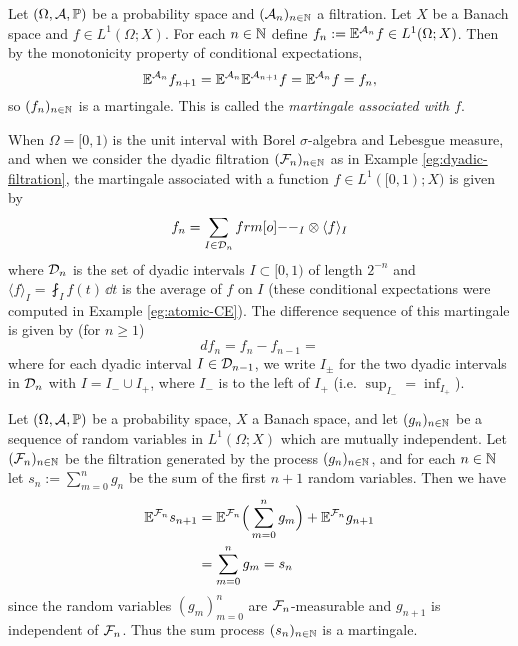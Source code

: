 \begin{example}
  Let $(\Omega, \mathcal{A}, \mathbb{P})$ be a probability space and $(\mathcal{A}_n)_{n \in \mathbb{N}}$ a filtration.
  Let $X$ be a Banach space and $f \in L^1(\Omega;X)$.
  For each $n \in \mathbb{N}$ define $f_n := \mathbb{E}^{\mathcal{A}_n}f \in L^1(\Omega;X)$.
  Then by the monotonicity property of conditional expectations,
  \begin{equation*}
    \mathbb{E}^{\mathcal{A}_n} f_{n+1} = \mathbb{E}^{\mathcal{A}_n} \mathbb{E}^{\mathcal{A}_{n+1}} f = \mathbb{E}^{\mathcal{A}_n} f = f_n,
  \end{equation*}
  so $(f_n)_{n \in \mathbb{N}}$ is a martingale.
  This is called the \emph{martingale associated with $f$}.

  When $\Omega = [0,1)$ is the unit interval with Borel $\sigma$-algebra and Lebesgue measure, and when we consider the dyadic filtration $(\mathcal{F}_n)_{n \in \mathbb{N}}$ as in Example \ref{eg:dyadic-filtration}, the martingale associated with a function $f \in L^1([0,1);X)$ is given by
  \begin{equation*}
    f_n = \sum_{I \in \mc{D}_n} \1_I \otimes \langle f \rangle_I
  \end{equation*}
  where $\mathcal{D}_n$ is the set of dyadic intervals $I \subset [0,1)$ of length $2^{-n}$ and $\langle f \rangle_I = \fint_I f(t) \, \dd t$ is the average of $f$ on $I$ (these conditional expectations were computed in Example \ref{eg:atomic-CE}).
  The difference sequence of this martingale is given by (for $n \geq 1$)
  \begin{equation*}
    df_n = f_n - f_{n-1} = 
  \end{equation*}
  where for each dyadic interval $I \in \mathcal{D}_{n-1}$, we write $I_\pm$ for the two dyadic intervals in $\mathcal{D}_{n}$ with $I = I_- \cup I_+$, where $I_-$ is to the left of $I_+$ (i.e. $\sup_{I_-} = \inf_{I_+}$).
  
\end{example}

\begin{example}
  Let $(\Omega, \mathcal{A}, \mathbb{P})$ be a probability space, $X$ a Banach space, and let $(g_n)_{n \in \mathbb{N}}$ be a sequence of random variables in $L^1(\Omega;X)$ which are mutually independent.
  Let $(\mathcal{F}_n)_{n \in \mathbb{N}}$ be the filtration generated by the process $(g_n)_{n \in \mathbb{N}}$, and for each $n \in \mathbb{N}$ let $s_n := \sum_{m=0}^n g_n$ be the sum of the first $n+1$ random variables.
  Then we have
  \begin{equation*}
    \begin{aligned}
      \mathbb{E}^{\mathcal{F}_n} s_{n+1} &= \mathbb{E}^{\mathcal{F}_n}\Big( \sum_{m=0}^ng_m \Big) + \mathbb{E}^{\mathcal{F}_n} g_{n+1} \\
      &=\sum_{m=0}^n g_m = s_n
    \end{aligned}
  \end{equation*}
  since the random variables $(g_m)_{m=0}^n$ are $\mathcal{F}_n$-measurable and $g_{n+1}$ is independent of $\mathcal{F}_n$.
  Thus the sum process $(s_n)_{n \in \mathbb{N}}$ is a martingale.
\end{example}

